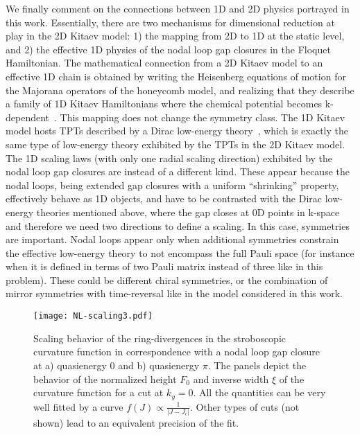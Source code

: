 \documentclass[aps,prb,twocolumn,superscriptaddress,groupedaddress]{revtex4}
\begin{document}
We finally comment on the connections between 1D and 2D physics portrayed in this work.
Essentially, there are two mechanisms for dimensional reduction at play in the 2D Kitaev model: 1) the mapping from 2D to 1D at the static level, and 2) the effective 1D physics of the nodal loop gap closures in the Floquet Hamiltonian.
The mathematical connection from a 2D Kitaev model to an effective 1D chain is obtained by writing the Heisenberg equations of motion for the Majorana operators of the honeycomb model, and realizing that they describe a family of 1D Kitaev Hamiltonians where the chemical potential becomes k-dependent~\cite{Thakurathi:2014}.
This mapping does not change the symmetry class. 
The 1D Kitaev model hosts TPTs described by a Dirac low-energy theory~\cite{Molignini:2018}, which is exactly the same type of low-energy theory exhibited by the TPTs in the 2D Kitaev model. 
The 1D scaling laws (with only one radial scaling direction) exhibited by the nodal loop gap closures are instead of a different kind. 
These appear because the nodal loops, being extended gap closures with a uniform ``shrinking'' property, effectively behave as 1D objects, and have to be contrasted with the Dirac low-energy theories mentioned above, where the gap closes at 0D points in k-space and therefore we need two directions to define a scaling. In this case, symmetries are important. 
Nodal loops appear only when additional symmetries constrain the effective low-energy theory to not encompass the full Pauli space (for instance when it is defined in terms of two Pauli matrix instead of three like in this problem). 
These could be different chiral symmetries, or the combination of mirror symmetries with time-reversal like in the model considered in this work.



\begin{figure}
\centering
\texttt{[image: NL-scaling3.pdf]}
\caption{Scaling behavior of the ring-divergences in the stroboscopic curvature function in correspondence with a nodal loop gap closure at a) quasienergy $0$ and b) quasienergy $\pi$.
The panels depict the behavior of the normalized height $F_0$ and inverse width $\xi$ of the curvature function for a cut at $k_y=0$.
All the quantities can be very well fitted by a curve $f(J) \propto \frac{1}{|J- J_c|}$.
Other types of cuts (not shown) lead to an equivalent precision of the fit.}
\label{fig:scaling-NL}
\end{figure}
\end{document}
